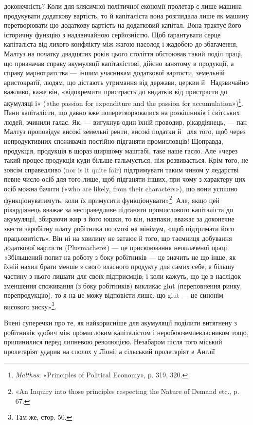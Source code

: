 \parcont{}  %
доконечність? Коли для клясичної політичної економії пролетар
є лише машина продукувати додаткову вартість, то
й капіталіста вона розглядала лише як машину перетворювати
цю додаткову вартість на додатковий капітал. Вона трактує
його історичну функцію з надзвичайною серйозністю. Щоб ґарантувати
серце капіталіста від лихого конфлікту між жагою
насолод і жадобою до збагачення, Малтуз на початку двадцятих
років цього століття обстоював такий поділ праці, що призначав
справу акумуляції капіталістові, дійсно занятому в продукції,
а справу марнотратства — іншим учасникам додаткової вартости,
земельній аристократії, людям, що дістають утримання від держави,
церкви й~ Надзвичайно важливо, каже він, «відокремити
пристрасть до видатків від пристрасти до акумуляці і» («the
passion for expenditure and the passion for accumulation»)\footnote{
\emph{Malthus}: «Principles of Political Economy», p. 319, 320.
}.
Пани капіталісти, що давно вже поперетворювалися на розкішників
і світських людей, зчинили галас. Як, — вигукнув один
їхній проводир, рікардіянець, — пан Малтуз проповідує високі
земельні ренти, високі податки й~ для того, щоб через непродуктивних
споживачів постійно підганяти промисловців! Щоправда,
продукція, продукція в щораз ширшому маштабі, таке
наше гасло. Але «через такий процес продукція куди більше
гальмується, ніж розвивається. Крім того, не зовсім справедливо
(nor is it quite fair) підтримувати таким чином у ледарстві певне
число осіб для того лише, щоб підганяти інших, при чому з характеру
цих осіб можна бачити («who are likely, from their characters»),
що вони успішно функціонуватимуть, коли їх примусити
функціонувати»\footnote{
«An Inquiry into those principles respecting the Nature of Demand
etc., p. 67.
}. Але, якщо цей рікардіянець вважає за несправедливе
підганяти промислового капіталіста до акумуляції,
збираючи жир з його юшки, то він, навпаки, вважає за доконечне
звести заробітну плату робітника по змозі на мінімум,
«щоб підтримати його працьовитість». Він ні на хвилину не
затаює й того, що таємниця добування додаткової вартости
(Plusmacherei) — це присвоювання неоплаченої праці. «Збільшений
попит на роботу з боку робітників — це значить не що
інше, як їхній нахил брати менше з свого власного продукту для
самих себе, а більшу частину з нього лишати для своїх підприємців;
і коли кажуть, що це в наслідок зменшення споживання
(з боку робітників) викликає glut (переповнення ринку, перепродукцію),
то я на це можу відповісти лише, що glut — це синонім
високого зиску»\footnote{
Там же, стор. 50.
}.

Вчені суперечки про те, як найкорисніше для акумуляції
поділити витягнену з робітників здобич між промисловим капіталістом
і неробою\dash{}землевласником тощо, припинилися перед
липневою революцією. Незабаром після того міський пролетаріят
ударив на сполох у Ліоні, а сільський пролетаріят в Англії
\parbreak{}  %
